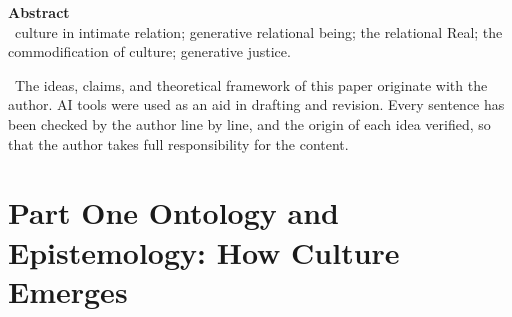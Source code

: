 \documentclass[11pt,a4paper]{article}
\begin{document}
\thispagestyle{empty}
\noindent\textbf{\large\color{rosedeep} Abstract}\\[0.6em]


\vspace{1.2em}
\, \textcolor{inksoft}{culture in intimate relation; generative relational being; the relational Real; the commodification of culture; generative justice.}

\vspace{1.0em}
\, \textcolor{inksoft}{The ideas, claims, and theoretical framework of this paper originate with the author. AI tools were used as an aid in drafting and revision. Every sentence has been checked by the author line by line, and the origin of each idea verified, so that the author takes full responsibility for the content.}
\newpage

\tableofcontents
\newpage

\part*{\textcolor{rosedeep}{Part One \quad Ontology and Epistemology: How Culture Emerges}}

\end{document}
